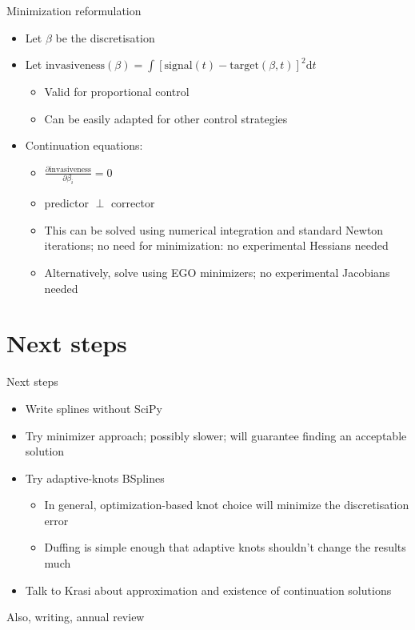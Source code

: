 \documentclass[presentation]{beamer}
\begin{document}
\begin{frame}[label={sec:org244ff5d}]{Minimization reformulation}
\begin{itemize}
\item Let \(\beta\) be the discretisation
\end{itemize}
\vfill
\begin{itemize}
\item Let \(\mathrm{invasiveness}(\beta) = \int \left[ \mathrm{signal}(t)-\mathrm{target}(\beta, t)\right]^2\mathrm{d}t\)
\begin{itemize}
\item Valid for proportional control
\item Can be easily adapted for other control strategies
\end{itemize}
\end{itemize}
\vfill
\begin{itemize}
\item Continuation equations:
\begin{itemize}
\item \(\frac{\partial \mathrm{invasiveness}}{\partial \beta_i} = 0\)
\item predictor \(\perp\) corrector
\item This can be solved using numerical integration and standard Newton iterations; \alert{no need for minimization}: no experimental Hessians needed
\item Alternatively, solve using EGO minimizers; no experimental Jacobians needed
\end{itemize}
\end{itemize}
\end{frame}



\section{Next steps}
\label{sec:orgf47ae11}
\begin{frame}[label={sec:orgd1b1634}]{Next steps}
\begin{itemize}
\item Write splines without SciPy
\end{itemize}
\vfill
\begin{itemize}
\item Try minimizer approach; possibly slower; will guarantee finding an acceptable solution
\end{itemize}
\vfill
\begin{itemize}
\item Try adaptive-knots BSplines
\begin{itemize}
\item In general, optimization-based knot choice will minimize the discretisation error
\item Duffing is simple enough that adaptive knots shouldn't change the results much
\end{itemize}
\end{itemize}
\vfill
\begin{itemize}
\item Talk to Krasi about approximation and existence of continuation solutions
\end{itemize}
\vfill
Also, writing, annual review
\end{frame}
\end{document}
